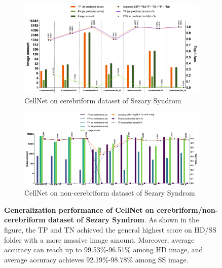 \begin{figure}[h]		
	\begin{center}
		\begin{subfigure}[b]{\textwidth}
			\includegraphics[width=\textwidth]{thesis-template-master/images/Ceribriform.jpg}
			\caption{CellNet on cerebriform dataset of Sezary Syndrom }
			\label{fig:res18}
		\end{subfigure}
		\begin{subfigure}[b]{\textwidth}
		    \centering
			\includegraphics[width=\textwidth]{thesis-template-master/images/Non-ceribriform.jpg}
			\caption{CellNet on non-cerebriform dataset of Sezary Syndrom }
			\label{fig:cellnet}
		\end{subfigure}
	\end{center}




\caption{\textbf{Generalization performance of CellNet on cerebriform/non-cerebriform dataset of Sezary Syndrom}. As shown in the figure, the TP and TN achieved the general highest score on HD/SS folder with a more massive image amount. Moreover, average accuracy can reach up to 99.53\%-96.51\% among HD image, and average accuracy achieves 92.19\%-98.78\% among SS image.}
\end{figure}





